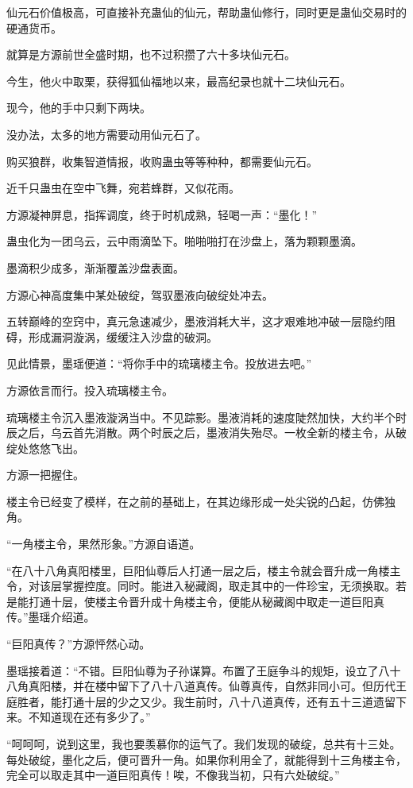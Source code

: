 \begin{this_body}
仙元石价值极高，可直接补充蛊仙的仙元，帮助蛊仙修行，同时更是蛊仙交易时的硬通货币。

就算是方源前世全盛时期，也不过积攒了六十多块仙元石。

今生，他火中取栗，获得狐仙福地以来，最高纪录也就十二块仙元石。

现今，他的手中只剩下两块。

没办法，太多的地方需要动用仙元石了。

购买狼群，收集智道情报，收购蛊虫等等种种，都需要仙元石。

近千只蛊虫在空中飞舞，宛若蜂群，又似花雨。

方源凝神屏息，指挥调度，终于时机成熟，轻喝一声：“墨化！”

蛊虫化为一团乌云，云中雨滴坠下。啪啪啪打在沙盘上，落为颗颗墨滴。

墨滴积少成多，渐渐覆盖沙盘表面。

方源心神高度集中某处破绽，驾驭墨液向破绽处冲去。

五转巅峰的空窍中，真元急速减少，墨液消耗大半，这才艰难地冲破一层隐约阻碍，形成漏洞漩涡，缓缓注入沙盘的破洞。

见此情景，墨瑶便道：“将你手中的琉璃楼主令。投放进去吧。”

方源依言而行。投入琉璃楼主令。

琉璃楼主令沉入墨液漩涡当中。不见踪影。墨液消耗的速度陡然加快，大约半个时辰之后，乌云首先消散。两个时辰之后，墨液消失殆尽。一枚全新的楼主令，从破绽处悠悠飞出。

方源一把握住。

楼主令已经变了模样，在之前的基础上，在其边缘形成一处尖锐的凸起，仿佛独角。

“一角楼主令，果然形象。”方源自语道。

“在八十八角真阳楼里，巨阳仙尊后人打通一层之后，楼主令就会晋升成一角楼主令，对该层掌握控度。同时。能进入秘藏阁，取走其中的一件珍宝，无须换取。若是能打通十层，使楼主令晋升成十角楼主令，便能从秘藏阁中取走一道巨阳真传。”墨瑶介绍道。

“巨阳真传？”方源怦然心动。

墨瑶接着道：“不错。巨阳仙尊为子孙谋算。布置了王庭争斗的规矩，设立了八十八角真阳楼，并在楼中留下了八十八道真传。仙尊真传，自然非同小可。但历代王庭胜者，能打通十层的少之又少。我生前时，八十八道真传，还有五十三道遗留下来。不知道现在还有多少了。”

“呵呵呵，说到这里，我也要羡慕你的运气了。我们发现的破绽，总共有十三处。每处破绽，墨化之后，便可晋升一角。如果你利用全了，就能得到十三角楼主令，完全可以取走其中一道巨阳真传！唉，不像我当初，只有六处破绽。”


\end{this_body}
